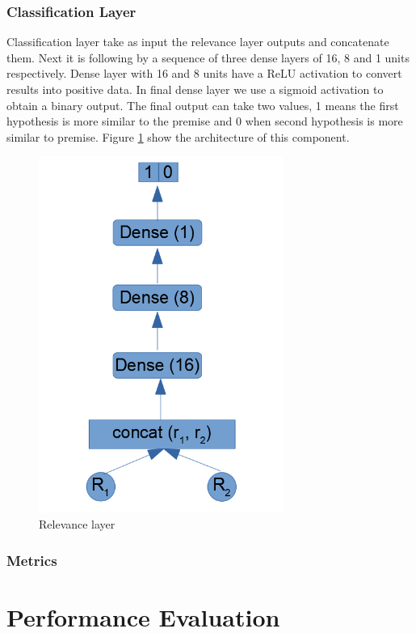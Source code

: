 \documentclass[12pt]{report}
\begin{document}
\subsection{Classification Layer}

Classification layer take as input the relevance layer outputs and concatenate them. Next it is following by a sequence of three dense layers of 16, 8 and 1 units respectively. Dense layer with 16 and 8 units have a \ac{ReLU} activation to convert results into positive data. In final dense layer we use a sigmoid activation to obtain a binary output. The final output can take two values, 1 means the first hypothesis is more similar to the premise and 0 when second hypothesis is more similar to premise. Figure \ref{figure:classification} show the architecture of this component.

\begin{figure}[H]	
	\centering
	\includegraphics[width=80mm, scale = 1]{images/15_classification.png}	
	\caption{Relevance layer}	
	\label{figure:classification}
\end{figure}

\subsection{Metrics}

\chapter{Performance Evaluation} \label{chapter 5}
\end{document}
